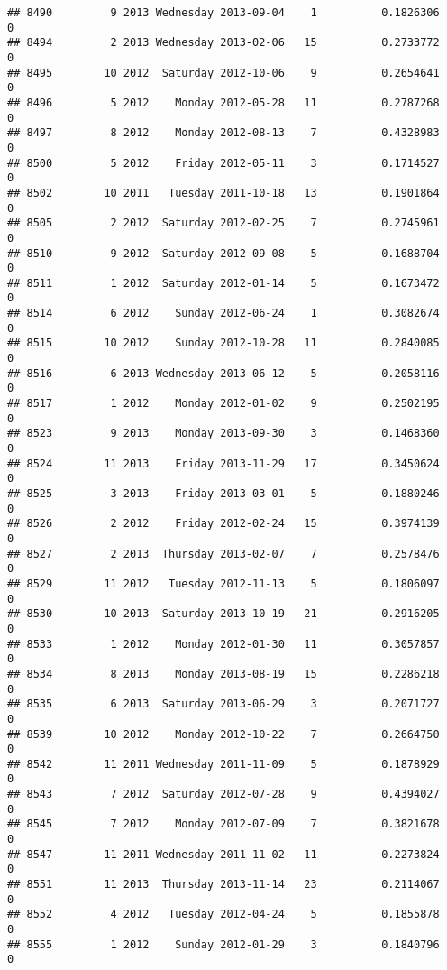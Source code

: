 \documentclass[
]{article}
\begin{document}
\begin{verbatim}
## 8490         9 2013 Wednesday 2013-09-04    1          0.1826306             0
## 8494         2 2013 Wednesday 2013-02-06   15          0.2733772             0
## 8495        10 2012  Saturday 2012-10-06    9          0.2654641             0
## 8496         5 2012    Monday 2012-05-28   11          0.2787268             0
## 8497         8 2012    Monday 2012-08-13    7          0.4328983             0
## 8500         5 2012    Friday 2012-05-11    3          0.1714527             0
## 8502        10 2011   Tuesday 2011-10-18   13          0.1901864             0
## 8505         2 2012  Saturday 2012-02-25    7          0.2745961             0
## 8510         9 2012  Saturday 2012-09-08    5          0.1688704             0
## 8511         1 2012  Saturday 2012-01-14    5          0.1673472             0
## 8514         6 2012    Sunday 2012-06-24    1          0.3082674             0
## 8515        10 2012    Sunday 2012-10-28   11          0.2840085             0
## 8516         6 2013 Wednesday 2013-06-12    5          0.2058116             0
## 8517         1 2012    Monday 2012-01-02    9          0.2502195             0
## 8523         9 2013    Monday 2013-09-30    3          0.1468360             0
## 8524        11 2013    Friday 2013-11-29   17          0.3450624             0
## 8525         3 2013    Friday 2013-03-01    5          0.1880246             0
## 8526         2 2012    Friday 2012-02-24   15          0.3974139             0
## 8527         2 2013  Thursday 2013-02-07    7          0.2578476             0
## 8529        11 2012   Tuesday 2012-11-13    5          0.1806097             0
## 8530        10 2013  Saturday 2013-10-19   21          0.2916205             0
## 8533         1 2012    Monday 2012-01-30   11          0.3057857             0
## 8534         8 2013    Monday 2013-08-19   15          0.2286218             0
## 8535         6 2013  Saturday 2013-06-29    3          0.2071727             0
## 8539        10 2012    Monday 2012-10-22    7          0.2664750             0
## 8542        11 2011 Wednesday 2011-11-09    5          0.1878929             0
## 8543         7 2012  Saturday 2012-07-28    9          0.4394027             0
## 8545         7 2012    Monday 2012-07-09    7          0.3821678             0
## 8547        11 2011 Wednesday 2011-11-02   11          0.2273824             0
## 8551        11 2013  Thursday 2013-11-14   23          0.2114067             0
## 8552         4 2012   Tuesday 2012-04-24    5          0.1855878             0
## 8555         1 2012    Sunday 2012-01-29    3          0.1840796             0

\end{verbatim}
\end{document}
